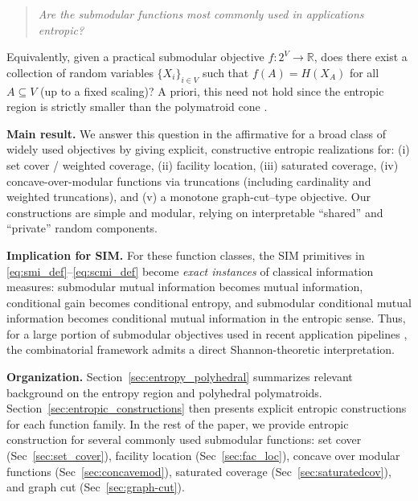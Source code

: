 \documentclass[conference]{IEEEtran}
\theoremstyle{definition}
\theoremstyle{remark}
\begin{document}
\begin{quote}
\emph{Are the submodular functions most commonly used in applications entropic?}
\end{quote}

Equivalently, given a practical submodular objective $f:2^V\to\mathbb{R}$, does there exist a collection of random variables
$\{X_i\}_{i\in V}$ such that $f(A)=H(X_A)$ for all $A\subseteq V$ (up to a fixed scaling)?
A priori, this need not hold since the entropic region is strictly smaller than the polymatroid cone
\cite{ZhangYeung1998,DoughertyFreilingZeger2011}.

\textbf{Main result.}
We answer this question in the affirmative for a broad class of widely used objectives by giving explicit, constructive
entropic realizations for:
(i) set cover / weighted coverage,
(ii) facility location,
(iii) saturated coverage,
(iv) concave-over-modular functions via truncations (including cardinality and weighted truncations), and
(v) a monotone graph-cut--type objective.
Our constructions are simple and modular, relying on interpretable ``shared'' and ``private'' random components.

\textbf{Implication for SIM.}
For these function classes, the SIM primitives in \eqref{eq:smi_def}--\eqref{eq:scmi_def} become \emph{exact instances}
of classical information measures: submodular mutual information becomes mutual information, conditional gain becomes
conditional entropy, and submodular conditional mutual information becomes conditional mutual information in the entropic
sense. Thus, for a large portion of submodular objectives used in recent application pipelines
\cite{kothawade2021similar,kothawade2022prism,karanam2022orient,li2022platinum,majee2024score,majee2024smile}, the combinatorial framework
admits a direct Shannon-theoretic interpretation.

\textbf{Organization.}
Section~\ref{sec:entropy_polyhedral} summarizes relevant background on the entropy region and polyhedral polymatroids.
Section~\ref{sec:entropic_constructions} then presents explicit entropic constructions for each function family. In the rest of the paper, we provide entropic construction for several commonly used submodular functions: set cover (Sec~\ref{sec:set_cover}), facility location (Sec~\ref{sec:fac_loc}), concave over modular functions (Sec~\ref{sec:concavemod}), saturated coverage (Sec~\ref{sec:saturatedcov}), and graph cut (Sec~\ref{sec:graph-cut}).

\end{document}
